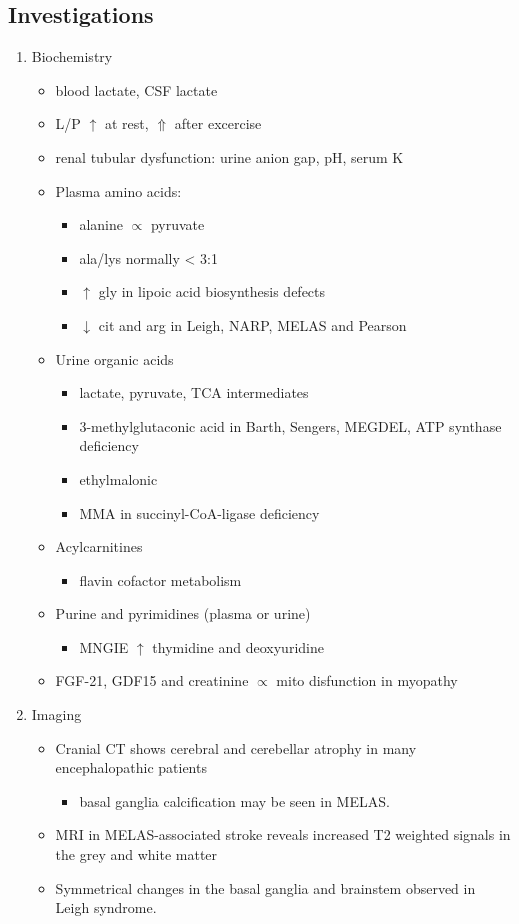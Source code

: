 \documentclass{scrartcl}
\begin{document}
\subsection{Investigations}
\label{sec:orgaea8a69}
\begin{enumerate}
\item Biochemistry
\label{sec:orgc9f2c7b}
\begin{itemize}
\item blood lactate, CSF lactate
\item L/P \(\uparrow\) at rest, \(\Uparrow\) after excercise
\item renal tubular dysfunction: urine anion gap, pH, serum K
\item Plasma amino acids:
\begin{itemize}
\item alanine \(\propto\) pyruvate
\item ala/lys normally \textless{} 3:1
\item \(\uparrow\) gly in lipoic acid biosynthesis defects
\item \(\downarrow\) cit and arg in Leigh, NARP, MELAS and Pearson
\end{itemize}
\item Urine organic acids
\begin{itemize}
\item lactate, pyruvate, TCA intermediates
\item 3-methylglutaconic acid in Barth, Sengers, MEGDEL, ATP synthase deficiency
\item ethylmalonic
\item MMA in succinyl-CoA-ligase deficiency
\end{itemize}
\item Acylcarnitines
\begin{itemize}
\item flavin cofactor metabolism
\end{itemize}
\item Purine and pyrimidines (plasma or urine)
\begin{itemize}
\item MNGIE \(\uparrow\) thymidine and deoxyuridine
\end{itemize}
\item FGF-21, GDF15 and creatinine \(\propto\) mito disfunction in myopathy
\end{itemize}

\item Imaging
\label{sec:org2a75e39}
\begin{itemize}
\item Cranial CT shows cerebral and cerebellar atrophy in many encephalopathic patients
\begin{itemize}
\item basal ganglia calcification may be seen in MELAS.
\end{itemize}
\item MRI in MELAS-associated stroke reveals increased T2 weighted signals in the grey and white matter
\item Symmetrical changes in the basal ganglia and brainstem observed in Leigh syndrome.
\end{itemize}


\end{enumerate}
\end{document}
